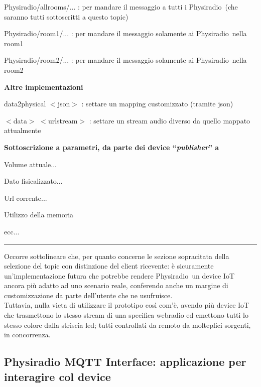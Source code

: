 \documentclass[12pt,a4paper]{report}
\newcommand{\physiradio}{Physiradio} %
\begin{document}
\begin{compactitem}
	\item Physiradio/allrooms/... : per mandare il messaggio a tutti i \physiradio\ (che saranno tutti sottoscritti a questo topic)
	\item Physiradio/room1/... : per mandare il messaggio solamente ai \physiradio\ nella room1
	\item Physiradio/room2/... : per mandare il messaggio solamente ai \physiradio\ nella room2
\end{compactitem}

\textbf{Altre implementazioni}

\begin{compactitem}
	\item data2physical $<$json$>$ : settare un mapping customizzato (tramite json)
	\item $<$data$>$ $<$urlstream$>$ : settare un stream audio diverso da quello mappato attualmente 
\end{compactitem}


\textbf{Sottoscrizione a parametri, da parte dei device ``\textit{publisher}'' a} 
\begin{compactitem}
	\item Volume attuale...
	\item Dato fisicalizzato...
	\item Url corrente...
	\item Utilizzo della memoria
	\item ecc... 
\end{compactitem}


\medskip
\hrule
\bigskip
\bigskip

\newpage
Occorre sottolineare che, per quanto concerne le sezione sopracitata della selezione del topic con distinzione del client ricevente: è sicuramente un'implementazione futura che potrebbe rendere \physiradio\ un device IoT ancora più adatto ad uno scenario reale, conferendo anche un margine di customizzazione da parte dell'utente che ne usufruisce. \\
Tuttavia, nulla vieta di utilizzare il prototipo così com'è, avendo più device IoT che trasmettono lo stesso stream di una specifica webradio ed emettono tutti lo stesso colore dalla striscia led; tutti controllati da remoto da molteplici sorgenti, in concorrenza.



\subsection{Physiradio MQTT Interface: applicazione per interagire col device} \label{sec:app}
\end{document}

